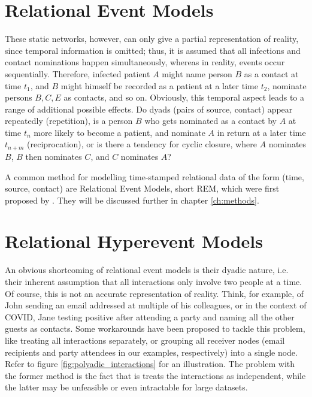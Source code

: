 \section{Relational Event Models}
\label{sec:intro_rem}

These static networks, however, can only give a partial representation of reality, since temporal information is omitted; thus, it is assumed that all infections and contact nominations happen simultaneously, whereas in reality, events occur sequentially. Therefore, infected patient $A$ might name person $B$ as a contact at time $t_1$, and $B$ might himself be recorded as a patient at a later time $t_2$, nominate persons $B,C,E$ as contacts, and so on. Obviously, this temporal aspect leads to a range of additional possible effects. Do dyads (pairs of source, contact) appear repeatedly (repetition), is a person $B$ who gets nominated as a contact by $A$ at time $t_n$ more likely to become a patient, and nominate $A$ in return at a later time $t_{n+m}$ (reciprocation), or is there a tendency for cyclic closure, where $A$ nominates $B$, $B$ then nominates $C$, and $C$ nominates $A$? 

A common method for modelling time-stamped relational data of the form (time, source, contact) are Relational Event Models, short REM, which were first proposed by . They will be discussed further in chapter \ref{ch:methods}.

\section{Relational Hyperevent Models}
\label{sec:intro_rhem}

An obvious shortcoming of relational event models is their dyadic nature, i.e. their inherent assumption that all interactions only involve two people at a time. Of course, this is not an accurate representation of reality. Think, for example, of John sending an email addressed at multiple of his colleagues, or in the context of COVID, Jane testing positive after attending a party and naming all the other guests as contacts. Some workarounds have been proposed to tackle this problem, like treating all interactions separately, or grouping all receiver nodes (email recipients and party attendees in our examples, respectively) into a single node. Refer to figure \ref{fig:polyadic_interactions} for an illustration. The problem with the former method is the fact that is treats the interactions as independent, while the latter may be unfeasible or even intractable for large datasets.

